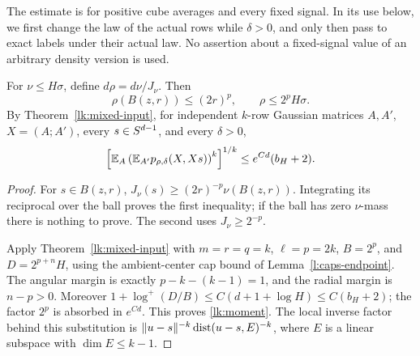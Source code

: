 The estimate is for positive cube averages and every fixed signal.
In its use below, we first change the law of the actual rows while
\(\delta>0\), and only then pass to exact labels under their actual
law. No assertion about a fixed-signal value of an arbitrary density
version is used.

\begin{lemma}\label{lk:reweight}
For \(\nu\le H\sigma\), define \(d\rho=d\nu/J_\nu\). Then
\[
 \rho(B(z,r))\le(2r)^p,\qquad \rho\le2^pH\sigma.
\]
By Theorem~\ref{lk:mixed-input}, for independent \(k\)-row
Gaussian matrices \(A,A'\), \(X=(A;A')\), every \(s\in S^{d-1}\), and
every \(\delta>0\),
\begin{equation}\label{lk:moment}
 \left[\mathbb E_A\left(\mathbb E_{A'}p_{\rho,\delta}(X,Xs)\right)^k\right]^{1/k}
 \le e^{Cd}(b_H+2).
\end{equation}
\end{lemma}
\begin{proof}
For \(s\in B(z,r)\), \(J_\nu(s)\ge(2r)^{-p}\nu(B(z,r))\).
Integrating its reciprocal over the ball proves the first inequality;
if the ball has zero \(\nu\)-mass there is nothing to prove. The second
uses \(J_\nu\ge2^{-p}\).

Apply Theorem~\ref{lk:mixed-input} with
\(m=r=q=k\), \(\ell=p=2k\), \(B=2^p\), and
\(D=2^{p+n}H\), using the ambient-center cap bound of
Lemma~\ref{l:caps-endpoint}. The angular margin is exactly
\(p-k-(k-1)=1\), and the radial margin is \(n-p>0\).
Moreover \(1+\log^+(D/B)\le C(d+1+\log H)\le C(b_H+2)\);
the factor \(2^p\) is absorbed in \(e^{Cd}\). This proves
\eqref{lk:moment}. The local inverse factor behind this substitution
is \(\|u-s\|^{-k}\operatorname{dist}(u-s,E)^{-k}\), where \(E\) is a linear
subspace with \(\dim E\le k-1\).
\end{proof}

